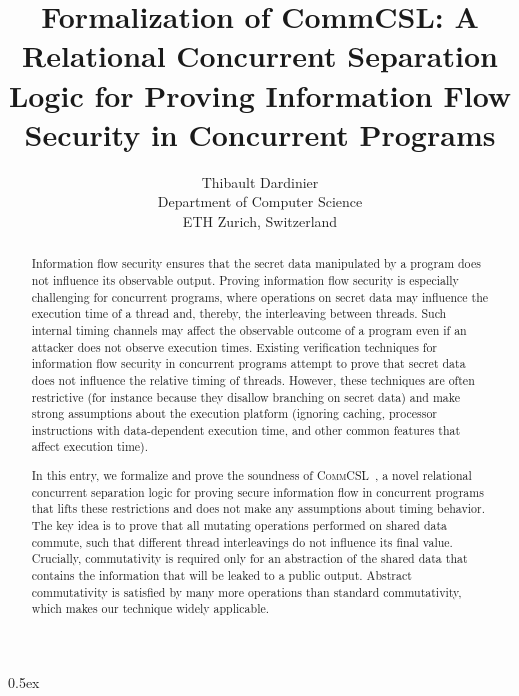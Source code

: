 \documentclass[11pt,a4paper]{article}
\begin{document}
\title{Formalization of CommCSL: A Relational Concurrent Separation Logic for Proving Information Flow Security in Concurrent Programs}
\author{Thibault Dardinier\\
Department of Computer Science\\ETH Zurich, Switzerland}

\maketitle

\begin{abstract}
Information flow security ensures that the secret data manipulated by a program does not influence its observable output.
Proving information flow security is especially challenging for concurrent programs, where operations on secret data may influence the execution time of a thread and, thereby, the interleaving between threads.
Such internal timing channels may affect the observable outcome of a program even if an attacker does not observe execution times.
Existing verification techniques for information flow security in concurrent programs attempt to prove that secret data does not influence the relative timing of threads.
However, these techniques are often restrictive (for instance because they disallow branching on secret data) and make strong assumptions about the execution platform (ignoring caching, processor instructions with data-dependent execution time, and other common features that affect execution time).

In this entry, we formalize and prove the soundness of \textsc{CommCSL}~\cite{CommCSL}, a novel relational concurrent separation logic for proving secure information flow in concurrent programs
that lifts these restrictions and does not make any assumptions about timing behavior.
The key idea is to prove that all mutating operations performed on shared data commute, such that different thread interleavings do not influence its final value.
Crucially, commutativity is required only for an abstraction of the shared data that contains the information that will be leaked to a public output.
Abstract commutativity is satisfied by many more operations than standard commutativity, which makes our technique widely applicable.
\end{abstract}

\clearpage

\tableofcontents

\parindent 0pt\parskip 0.5ex





\end{document}
